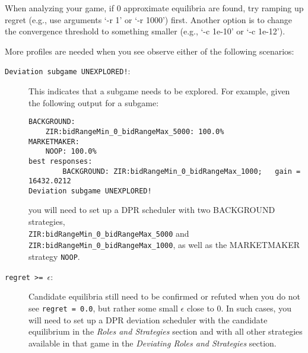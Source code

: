 \documentclass[11pt]{article}
\begin{document}
When analyzing your game, if 0 approximate equilibria are found, try ramping up regret (e.g., use arguments `-r 1' or `-r 1000') first.
Another option is to change the convergence threshold to something smaller (e.g., `-c 1e-10' or `-c 1e-12').

More profiles are needed when you see observe either of the following scenarios:
\begin{description}
\item[\texttt{Deviation subgame UNEXPLORED!}:] This indicates that a subgame needs to be explored.
For example, given the following output for a subgame:
\begin{verbatim}
BACKGROUND:
    ZIR:bidRangeMin_0_bidRangeMax_5000: 100.0%
MARKETMAKER:
    NOOP: 100.0%
best responses:
        BACKGROUND: ZIR:bidRangeMin_0_bidRangeMax_1000;   gain = 16432.0212
Deviation subgame UNEXPLORED!
\end{verbatim}
you will need to set up a DPR scheduler with two BACKGROUND strategies, \\
\verb|ZIR:bidRangeMin_0_bidRangeMax_5000| and \verb|ZIR:bidRangeMin_0_bidRangeMax_1000|, as well as the MARKETMAKER strategy \verb|NOOP|.

\item[\texttt{regret >= $\epsilon$}:] Candidate equilibria still need to be confirmed or refuted when you do not see \verb|regret = 0.0|, but rather some small $\epsilon$ close to 0. In such cases, you will need to set up a DPR deviation scheduler with the candidate equilibrium in the \emph{Roles and Strategies} section and with all other strategies available in that game in the \emph{Deviating Roles and Strategies} section.

\end{description}



\end{document}
